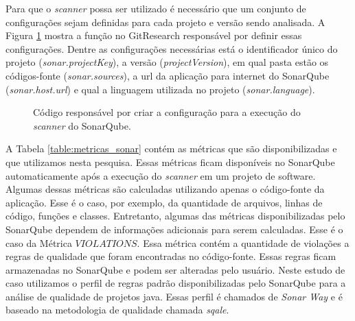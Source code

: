 Para que o \textit{scanner} possa ser utilizado é necessário que um conjunto de configurações sejam definidas para cada projeto e versão sendo analisada. A Figura \ref{fig:configuracao_sonar_scanner} mostra a função no GitResearch responsável por definir essas configurações. Dentre as configurações necessárias está o identificador único do projeto (\textit{sonar.projectKey}), a versão (\textit{projectVersion}), em qual pasta estão os códigos-fonte (\textit{sonar.sources}), a url da aplicação para internet do SonarQube (\textit{sonar.host.url}) e qual a linguagem utilizada no projeto (\textit{sonar.language}). 


 \begin{figure}[H]
  \centering
  \caption{Código responsável por criar a configuração para a execução do \textit{scanner} do SonarQube.}
  \label{fig:configuracao_sonar_scanner} 
\end{figure}


A Tabela \ref{table:metricas_sonar} contém as métricas que são disponibilizadas e que utilizamos nesta pesquisa.  Essas métricas ficam disponíveis no SonarQube automaticamente após a execução do \textit{scanner} em um projeto de software. Algumas dessas métricas são calculadas utilizando apenas o código-fonte da aplicação. Esse é o caso, por exemplo, da quantidade de arquivos, linhas de código, funções e classes. Entretanto, algumas das métricas disponibilizadas pelo SonarQube dependem de informações adicionais para serem calculadas. Esse é o caso  da Métrica $VIOLATIONS$. Essa métrica contém a quantidade de violações a regras de qualidade que foram encontradas no código-fonte. Essas regras ficam armazenadas no SonarQube e podem ser alteradas pelo usuário. Neste estudo de caso utilizamos o perfil de regras padrão disponibilizadas pelo SonarQube para a análise de qualidade de projetos java. Essas perfil é chamados de \textit{Sonar Way}\cite{arapidis2012sonar} e é baseado na metodologia de qualidade chamada \textit{sqale}\cite{letouzey2012sqale}.


